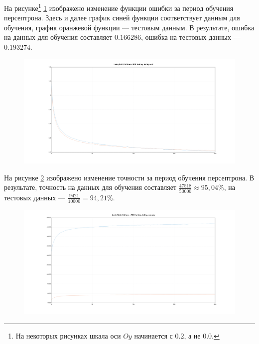 \documentclass[a4paper, 14pt]{extarticle}
\begin{document}

На рисунке\footnote{На некоторых рисунках шкала оси $Oy$ начинается с $0.2$, а не $0.0$.} \ref{fig:1_20_leaky_relu_softmax_mse_cost} изображено
изменение функции ошибки за период обучения персептрона. Здесь и далее график синей функции соответствует данным для обучения, график оранжевой
функции --- тестовым данным. В результате, ошибка на данных для обучения составляет $0.166286$, ошибка на тестовых данных --- $0.193274$.

\begin{figure}[!htb]
  \centering\includegraphics[width=\textwidth]{images/1_20_leaky_relu_softmax_mse_cost.png}
  \caption{}
  \label{fig:1_20_leaky_relu_softmax_mse_cost}
\end{figure}

На рисунке \ref{fig:1_20_leaky_relu_softmax_mse_accuracy} изображено изменение точности за период обучения персептрона.
В результате, точность на данных для обучения составляет $\frac{47518}{50000} \approx 95,04\%$, на тестовых данных --- $\frac{9421}{10000} = 94,21\%$.

\begin{figure}[!htb]
  \centering\includegraphics[width=\textwidth]{images/1_20_leaky_relu_softmax_mse_accuracy.png}
  \caption{}
  \label{fig:1_20_leaky_relu_softmax_mse_accuracy}
\end{figure}
\end{document}
